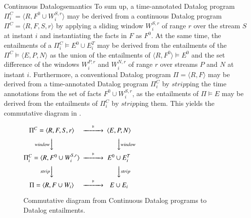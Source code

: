 \begin{nestedsection}{Continuous Datalog}{semantics}
To sum up, a time-annotated Datalog program
${\Pi^C_i = \langle R, F^0 \cup W^{S,r}_i \rangle}$ may be derived from
a continuous Datalog program ${\Pi^C = \langle R, F, S, r \rangle}$ by
applying a sliding window $W^{S,r}_i$ of range $r$ over the stream $S$ at
instant $i$ and instantiating the facts in $F$ as $F^0$. At the same time,
the entailments of a ${\Pi^C_i \vDash E^0 \cup E^T_i}$ may be derived from
the entailments of the ${\Pi^C \vDash \langle E, P, N \rangle}$ as the union
of the entailments of ${\langle R, F^0 \rangle \vDash E^0}$ and the set
difference of the windows $W^{P,r}_i$ and $W^{N,r}_i$ of range $r$ over
streams $P$ and $N$ at instant $i$.
Furthermore, a conventional Datalog program ${\Pi = \langle R, F \rangle}$
may be derived from a time-annotated Datalog program $\Pi^C_i$ by
${strip}$ping the time annotations from the set of facts
${F^0 \cup W^{S,r}_i}$, as the entailments of ${\Pi \vDash E}$ may be
derived from the entailments of $\Pi^C_i$ by $strip$ping them.
This yields the commutative diagram in .
\begin{figure}
	\centering
	$
	\begin{CD}
		{\Pi^C = \langle R, F, S, r \rangle} @>\vDash>> {\langle E, P, N \rangle} \\
		@V{window}VV @VV{window}V \\
		{\Pi^C_i = \langle R, F^0 \cup W^{S,r}_i \rangle} @>\vDash>> {E^0 \cup E^T_i} \\
		@V{strip}VV @VV{strip}V \\
		{\Pi = \langle R, F \cup W_i \rangle} @>\vDash>> {E \cup E_i}
	\end{CD}
	$
	\caption{Commutative diagram from Continuous Datalog programs to Datalog entailments.}
\end{figure}
\end{nestedsection}
